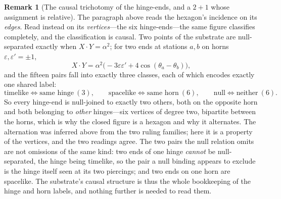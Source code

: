 \documentclass[11pt,a4paper]{article}
\theoremstyle{definition}
\newtheorem{remark}[theorem]{Remark}
\begin{document}
\begin{remark}[The causal trichotomy of the hinge-ends, and a $2{+}1$ whose assignment is relative]\label{rem:hingetriple}
The paragraph above reads the hexagon's incidence on its \emph{edges}. Read instead on its \emph{vertices}---the six hinge-ends---the same figure classifies completely, and the classification is causal. Two points of the substrate are null-separated exactly when $X\cdot Y=\alpha^{2}$; for two ends at stations $a,b$ on horns $\varepsilon,\varepsilon'=\pm1$,
\[
  X\cdot Y=\alpha^{2}\bigl(-3\varepsilon\varepsilon'+4\cos(\theta_{a}-\theta_{b})\bigr),
\]
and the fifteen pairs fall into exactly three classes, each of which encodes exactly one shared label:
\[
  \text{timelike}\iff\text{same hinge}\ (3),\qquad
  \text{spacelike}\iff\text{same horn}\ (6),\qquad
  \text{null}\iff\text{neither}\ (6).
\]
So every hinge-end is null-joined to exactly two others, both on the opposite horn and both belonging to \emph{other} hinges---six vertices of degree two, bipartite between the horns, which is why the closed figure is a hexagon and why it alternates. The alternation was inferred above from the two ruling families; here it is a property of the vertices, and the two readings agree. The two pairs the null relation omits are not omissions of the same kind: two ends of one hinge \emph{cannot} be null-separated, the hinge being timelike, so the pair a null binding appears to exclude is the hinge itself seen at its two piercings; and two ends on one horn are spacelike. The substrate's causal structure is thus the whole bookkeeping of the hinge and horn labels, and nothing further is needed to read them.


\end{remark}
\end{document}
